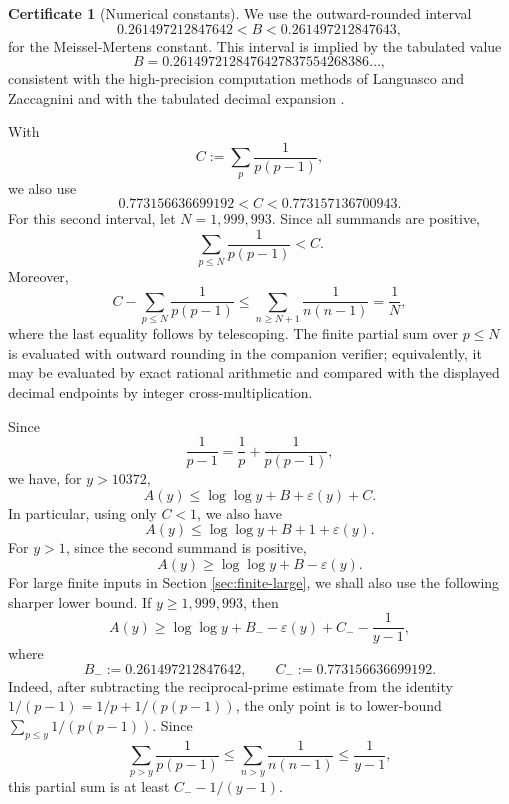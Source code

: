 \documentclass[11pt]{article}
\numberwithin{equation}{section}
\theoremstyle{plain}
\theoremstyle{definition}
\newtheorem{certificate}[theorem]{Certificate}
\theoremstyle{remark}
\newcommand{\eps}{\varepsilon}
\begin{document}
\begin{certificate}[Numerical constants]\label{cert:constants}
We use the outward-rounded interval
\begin{equation}\label{eq:B-interval}
0.261497212847642<B<0.261497212847643,
\end{equation}
for the Meissel-Mertens constant.  This interval is implied by the tabulated value
\[
        B=0.2614972128476427837554268386\ldots,
\]
consistent with the high-precision computation methods of Languasco and Zaccagnini \cite{LanguascoZaccagnini2010} and with the tabulated decimal expansion \cite{OEISMertens}.

With
\[
        C:=\sum_p\frac1{p(p-1)},
\]
we also use
\begin{equation}\label{eq:C-interval}
0.773156636699192<C<0.773157136700943.
\end{equation}
For this second interval, let \(N=1{,}999{,}993\).  Since all summands are positive,
\[
        \sum_{p\le N}\frac1{p(p-1)}<C.
\]
Moreover,
\[
        C-\sum_{p\le N}\frac1{p(p-1)}
        \le
        \sum_{n\ge N+1}\frac1{n(n-1)}
        =
        \frac1N,
\]
where the last equality follows by telescoping.  The finite partial sum over \(p\le N\) is evaluated with outward rounding in the companion verifier; equivalently, it may be evaluated by exact rational arithmetic and compared with the displayed decimal endpoints by integer cross-multiplication.
\end{certificate}

Since
\[
        \frac1{p-1}=\frac1p+\frac1{p(p-1)},
\]
we have, for \(y>10372\),
\begin{equation}\label{eq:A-upper}
A(y)\le \log\log y+B+\eps(y)+C.
\end{equation}
In particular, using only \(C<1\), we also have
\begin{equation}\label{eq:A-upper-weak}
A(y)\le \log\log y+B+1+\eps(y).
\end{equation}
For \(y>1\), since the second summand is positive,
\begin{equation}\label{eq:A-lower-weak}
A(y)\ge \log\log y+B-\eps(y).
\end{equation}
For large finite inputs in Section \ref{sec:finite-large}, we shall also use the following sharper lower bound.  If \(y\ge 1{,}999{,}993\), then
\begin{equation}\label{eq:A-lower-sharp}
A(y)\ge \log\log y+B_- -\eps(y)+C_- -\frac1{y-1},
\end{equation}
where
\[
        B_-:=0.261497212847642,
        \qquad
        C_-:=0.773156636699192.
\]
Indeed, after subtracting the reciprocal-prime estimate from the identity
\(1/(p-1)=1/p+1/(p(p-1))\), the only point is to lower-bound
\(\sum_{p\le y}1/(p(p-1))\).  Since
\[
        \sum_{p>y}\frac1{p(p-1)}
        \le
        \sum_{n>y}\frac1{n(n-1)}
        \le \frac1{y-1},
\]
this partial sum is at least \(C_- -1/(y-1)\).
\end{document}
